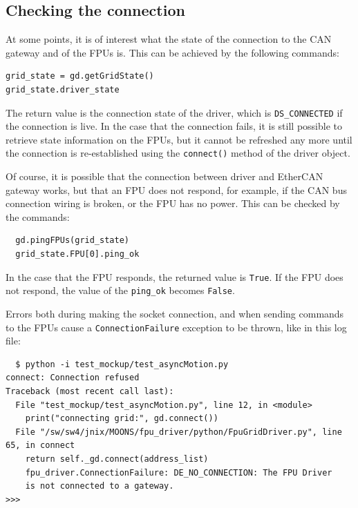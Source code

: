 \documentclass[11pt,a4paper]{scrartcl}
\begin{document}
\subsection{Checking the connection}
\begin{samepage}
At some points, it is of interest what the state of
the connection to the CAN gateway and of the FPUs is.
This can be achieved by the following commands:
\begin{verbatim}
grid_state = gd.getGridState()
grid_state.driver_state  
\end{verbatim}
The return value is the connection state of the driver, which is
\texttt{DS\_CONNECTED} if the connection is live.  In the case that the
connection fails, it is still possible to retrieve state information
on the FPUs, but it cannot be refreshed any more until the connection
is re-established using the \texttt{connect()} method of the driver
object.
\end{samepage}

 Of course, it is possible that the
connection between driver and EtherCAN gateway works, but that an FPU
does not respond, for example, if the CAN bus connection wiring is
broken, or the FPU has no power. This can be checked by the commands:

\begin{verbatim}
  gd.pingFPUs(grid_state)
  grid_state.FPU[0].ping_ok
\end{verbatim}

In the case that the FPU responds, the returned value is
\texttt{True}.  If the FPU does not respond, the value of the
\verb+ping_ok+ becomes \texttt{False}.

Errors both during making the socket connection, and when sending
commands to the FPUs cause a \texttt{ConnectionFailure} exception to
be thrown, like in this log file:

\begin{verbatim}
  $ python -i test_mockup/test_asyncMotion.py 
connect: Connection refused
Traceback (most recent call last):
  File "test_mockup/test_asyncMotion.py", line 12, in <module>
    print("connecting grid:", gd.connect())
  File "/sw/sw4/jnix/MOONS/fpu_driver/python/FpuGridDriver.py", line 65, in connect
    return self._gd.connect(address_list)
    fpu_driver.ConnectionFailure: DE_NO_CONNECTION: The FPU Driver
    is not connected to a gateway.
>>> 
\end{verbatim}
\end{document}
